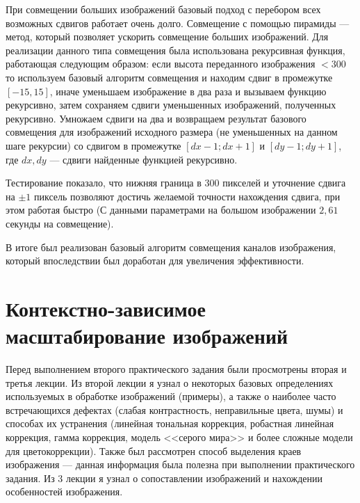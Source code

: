 \documentclass[12pt]{article}
\begin{document}
При совмещении больших изображений базовый подход с перебором всех возможных сдвигов работает очень долго. Совмещение с помощью пирамиды --- метод, который позволяет ускорить совмещение больших изображений. Для реализации данного типа совмещения была использована рекурсивная функция, работающая следующим образом: если высота переданного изображения $< 300$ то используем базовый алгоритм совмещения и находим сдвиг в промежутке $[-15, 15]$, иначе уменьшаем изображение в два раза и вызываем функцию рекурсивно, затем сохраняем сдвиги уменьшенных изображений, полученных рекурсивно. Умножаем сдвиги на два и возвращаем результат базового совмещения для изображений исходного размера (не уменьшенных на данном шаге рекурсии) со сдвигом в промежутке $[dx - 1; dx + 1]$ и $[dy - 1; dy + 1]$, где $dx, dy$ --- сдвиги найденные функцией рекурсивно.

Тестирование показало, что нижняя граница в $300$ пикселей и уточнение сдвига на $\pm 1$ пиксель позволяют достичь желаемой точности нахождения сдвига, при этом работая быстро (С данными параметрами на большом изображении $2,61$ секунды на совмещение).

В итоге был реализован базовый алгоритм совмещения каналов изображения, который впоследствии был доработан для увеличения эффективности.

\section*{Контекстно-зависимое масштабирование изображений}
%

Перед выполнением второго практического задания были просмотрены вторая и третья лекции. Из второй лекции я узнал о некоторых базовых определениях используемых в обработке изображений (примеры), а также о наиболее часто встречающихся дефектах (слабая контрастность, неправильные цвета, шумы) и способах их устранения (линейная тональная коррекция, робастная линейная коррекция, гамма коррекция, модель <<серого мира>> и более сложные модели для цветокоррекции). Также был рассмотрен способ выделения краев изображения --- данная информация была полезна при выполнении практического задания. Из 3 лекции я узнал о сопоставлении изображений и нахождении особенностей изображения.
\end{document}
